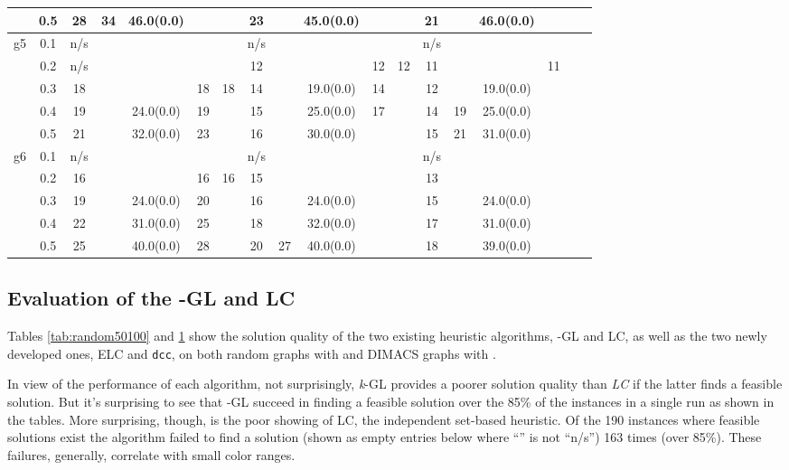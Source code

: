 \documentclass[10pt]{article}
\begin{document}
\begin{table}[H]
\begin{tabular}{|c|c|c|c|c|c|c||c|c|c|c|c||c|c|c|c|c|c|}
	\hline
	&0.5&28& 34 & 46.0(0.0) & &  & 23&  & 45.0(0.0) &  &  & 21&&46.0(0.0)&&\\ 
	\hline
	g5&0.1&n/s&  & & & &n/s&  &  &  &  & n/s&&&&\\ 
	\hline
	&0.2&n/s&  & & & &12 & & & 12 & 12 & 11&&&11&\\ 
	\hline
	&0.3&18& &  & 18& 18&14 &  &19.0(0.0)& 14 &  & 12&&19.0(0.0)&&\\ 
	\hline
	&0.4&19&  & 24.0(0.0) & 19&  & 15 &  & 25.0(0.0) &17 &  & 14&19&25.0(0.0)&&\\ 
	\hline
	&0.5&21& & 32.0(0.0) & 23&  & 16&  & 30.0(0.0) &  &  & 15&21&31.0(0.0)&&\\ 
	\hline
	g6&0.1&n/s&  & & & &n/s&  &  &  &  & n/s&&&&\\ 
	\hline
	&0.2&16&  & &16 &16 &15 & & &  &  & 13&&&&\\ 
	\hline
	&0.3&19& & 24.0(0.0) & 20& &16 &  &24.0(0.0)&  &  & 15&&24.0(0.0)&&\\ 
	\hline
	&0.4&22&  & 31.0(0.0) & 25&  & 18 &  & 32.0(0.0) & &  & 17&&31.0(0.0)&&\\ 
	\hline
	&0.5&25& & 40.0(0.0) & 28&  & 20&  27& 40.0(0.0) &  &  & 18&&39.0(0.0)&&\\ 
	\hline
  \end{tabular}

    \label{tab:dimacs}
\end{table}

\subsection{Evaluation of the -GL and LC}\label{sec:heur-evaluation} 

Tables \ref{tab:random50100} and \ref{tab:dimacs} show the solution quality of the two 
existing heuristic algorithms, -GL and LC, as well as the two newly developed ones, ELC and \texttt{dcc}, on
both random graphs with  and DIMACS graphs with .

In view of the performance of each
algorithm, not surprisingly, \textit{k}-GL provides a poorer solution
quality than \textit{LC} if the latter finds a feasible solution.  But  it's surprising 
to see that -GL succeed in finding a feasible
solution over the 85\% of the instances in a single run as shown in the tables. 
  More surprising, though, is the poor showing
 of LC, the independent set-based heuristic.  Of the 190 instances where feasible solutions
 exist the algorithm failed to find a solution (shown as empty entries
 below where ``'' is not ``n/s'') 163 times (over 85\%). These failures, generally, correlate with small
 color ranges. 
 
\end{document}

